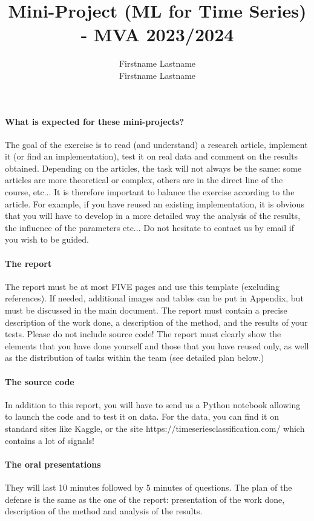 \documentclass[11pt]{article}
\title{Mini-Project (ML for Time Series) - MVA 2023/2024}
\author{
Firstname Lastname \email{youremail1@mail.com} \\ %
Firstname Lastname \email{youremail2@mail.com} %
}
\begin{document}
\maketitle

\paragraph{What is expected for these mini-projects?}
The goal of the exercise is to read (and understand) a research article, implement it (or find an implementation), test it on real data and comment on the results obtained.
Depending on the articles, the task will not always be the same: some articles are more theoretical or complex, others are in the direct line of the course, etc... It is therefore important to balance the exercise according to the article. For example, if you have reused an existing implementation, it is obvious that you will have to develop in a more detailed way the analysis of the results, the influence of the parameters etc... Do not hesitate to contact us by email if you wish to be guided.

\paragraph{The report}
 The report must be at most FIVE pages and use this template (excluding references). If needed, additional images and tables can be put in Appendix, but must be discussed in the main document. The report must contain a precise description of the work done, a description of the method, and the results of your tests. Please do not include source code! The report must clearly show the elements that you have done yourself and those that you have reused only, as well as the distribution of tasks within the team (see detailed plan below.)
 
 \paragraph{The source code}
In addition to this report, you will have to send us a Python notebook allowing to launch the code and to test it on data. For the data, you can find it on standard sites like Kaggle, or the site https://timeseriesclassification.com/ which contains a lot of signals!


\paragraph{The oral presentations}
They will last 10 minutes followed by 5 minutes of questions. The plan of the defense is the same as the one of the report: presentation of the work done, description of the method and analysis of the results.
\end{document}
